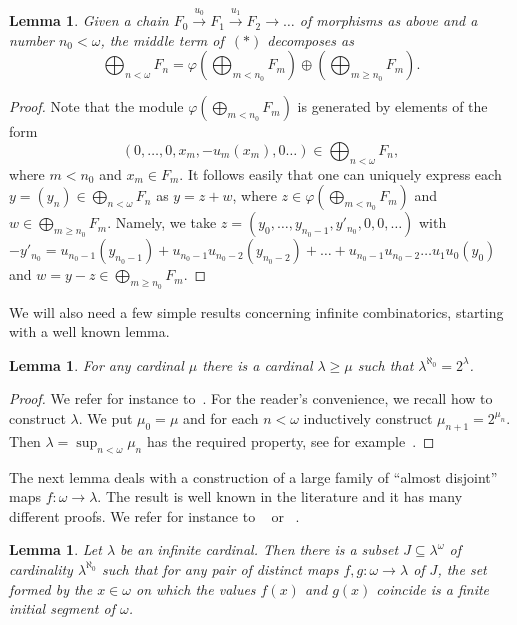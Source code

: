 \documentclass[a4paper,11pt]{amsart}
\newcommand{\st}{such that }
\theoremstyle{plain}
\newtheorem{lem}[thm]{Lemma}
\theoremstyle{definition}
\theoremstyle{remark}
\begin{document}
\begin{lem} \label{lem:local_splitting_of_lim}
Given a chain $ F_0 \overset{u_0}\to F_1 \overset{u_1}\to F_2 \to \dots$ of morphisms as above and a number $n_0 < \omega$, the middle term of~$(*)$ decomposes as
%
$$ \bigoplus_{n<\omega} F_n = \varphi\left(\bigoplus_{m<n_0} F_m\right) \oplus \left(\bigoplus_{m\ge n_0} F_m\right). $$
\end{lem}

\begin{proof}
Note that the module $\varphi(\bigoplus_{m<n_0} F_m)$ is generated by elements of the form
%
$$
\left(0, \dots, 0, x_m, -u_m(x_m), 0 \dots\right) \in \bigoplus_{n<\omega} F_n,
$$
%
where $m < n_0$ and $x_m \in F_m$. It follows easily that one can uniquely express each $y = (y_n) \in \bigoplus_{n<\omega} F_n$ as $y = z+w$, where $z \in \varphi\left(\bigoplus_{m<n_0} F_m\right)$ and $w \in \bigoplus_{m\ge n_0} F_m$. Namely, we take 
$z = (y_0, \dots, y_{n_0-1},y'_{n_0}, 0, 0, \dots)$ with $-y'_{n_0}=u_{n_0-1}(y_{n_0-1}) + u_{n_0-1}u_{n_0-2}(y_{n_0-2}) + \dots + u_{n_0-1}u_{n_0-2}\dots u_{1}u_{0}(y_0)$ and $w = y-z \in \bigoplus_{m\ge n_0} F_m$.
\end{proof}

We will also need a few simple results concerning infinite combinatorics, starting with a well known lemma.

\begin{lem} \label{lem:nice_cardinals}
For any cardinal $\mu$ there is a cardinal $\lambda \ge \mu$ \st $\lambda^{\aleph_0} = 2^\lambda$.
\end{lem}

\begin{proof}
We refer for instance to~\cite[Lemma 3.1]{Gr}. For the reader's convenience, we recall how to construct $\lambda$. We put $\mu_0 = \mu$ and for each $n<\omega$ inductively construct $\mu_{n+1} = 2^{\mu_n}$. Then $\lambda = \sup_{n<\omega} \mu_n$ has the required property, see for example~\cite[p. 50, fact (6.21)]{Jech}.
\end{proof}

The next lemma deals with a construction of a large family of ``almost disjoint'' maps $f: \omega \to \lambda$. The result is
well known in the literature and it has many different proofs. We refer for instance to ~\cite[Lemma 2.3]{Ba} or ~\cite[Proposition II.5.5]{EM}.

\begin{lem} \label{lem:almost_disjoint} 
Let $\lambda$ be an infinite cardinal. Then there is a subset $J \subseteq \lambda^\omega$ of cardinality $\lambda^{\aleph_0}$ \st for any pair of distinct maps $f,g: \omega \to \lambda$ of $J$, the set formed by the $x \in \omega$ on which the values $f(x)$ and $g(x)$ coincide is a finite initial segment of $\omega$.
\end{lem}
\end{document}
